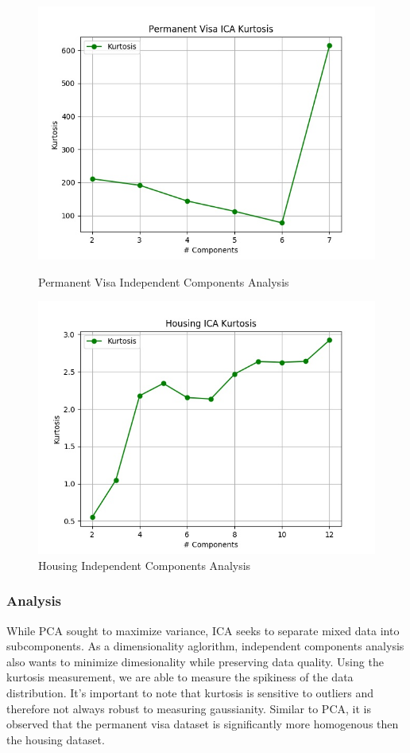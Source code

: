 \documentclass[h]{article}
\begin{document}
 \begin{figure}[H]
      \includegraphics[width=1\textwidth,keepaspectratio]{permanent_visa_ica_kurtosis.jpg} 
      \caption*{Permanent Visa Independent Components Analysis } 
   \endminipage\hfill
      \includegraphics[width=1\textwidth,keepaspectratio]{housing_ica_kurtosis.jpg} 
      \caption*{Housing Independent Components Analysis } 
   \endminipage\hfill
\end{figure}


\subsubsection*{Analysis}
While PCA sought to maximize variance, ICA seeks to separate mixed data into 
subcomponents.  As a dimensionality aglorithm, independent components analysis also wants to minimize 
dimesionality while preserving data quality.  Using the kurtosis measurement, 
we are able to measure the spikiness of the data distribution.  It's important to note that kurtosis is 
sensitive to outliers and therefore not always robust to measuring gaussianity.  
Similar to PCA, it is observed that the permanent visa dataset is significantly 
more homogenous then the housing dataset.
\end{document}
